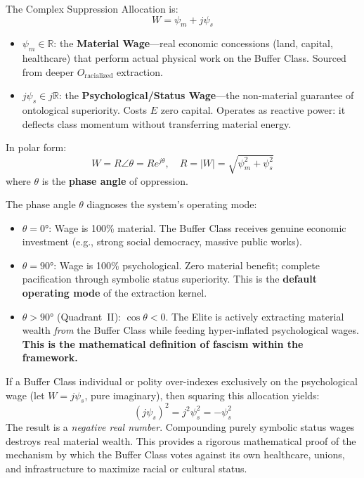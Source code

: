 \begin{definition}
\label{def:complex-wage}
The Complex Suppression Allocation is:
\begin{equation}\label{eq:2.2b-complex-wage-def}
W = \psi_m + j\psi_s
\end{equation}
\begin{itemize}
    \item $\psi_m \in \mathbb{R}$: the \textbf{Material Wage}---real economic
    concessions (land, capital, healthcare) that perform actual physical work on
    the Buffer Class. Sourced from deeper $O_{\text{racialized}}$ extraction.
    \item $j\psi_s \in j\mathbb{R}$: the \textbf{Psychological/Status
    Wage}---the non-material guarantee of ontological superiority. Costs $E$
    zero capital. Operates as reactive power: it deflects class momentum without
    transferring material energy.
\end{itemize}
In polar form:
\begin{equation}\label{eq:2.2c-polar-form}
W = R \angle\theta = R e^{j\theta}, \quad R = |W| = \sqrt{\psi_m^2 + \psi_s^2}
\end{equation}
where $\theta$ is the \textbf{phase angle} of oppression.
\end{definition}

The phase angle $\theta$ diagnoses the system's operating mode:
\begin{itemize}
    \item $\theta = 0°$: Wage is 100\% material. The Buffer Class receives genuine
    economic investment (e.g., strong social democracy, massive public works).
    \item $\theta = 90°$: Wage is 100\% psychological. Zero material benefit;
    complete pacification through symbolic status superiority. This is the
    \textbf{default operating mode} of the extraction kernel.
    \item $\theta > 90°$ (Quadrant~II): $\cos\theta < 0$. The Elite is actively
    extracting material wealth \emph{from} the Buffer Class while feeding
    hyper-inflated psychological wages. \textbf{This is the mathematical
    definition of fascism within the framework.}
\end{itemize}

\begin{theorem}
\label{thm:imaginary-squaring}
If a Buffer Class individual or polity over-indexes exclusively on the
psychological wage (let $W = j\psi_s$, pure imaginary), then squaring this
allocation yields:
\begin{equation}\label{eq:2.2d-imaginary-squaring}
(j\psi_s)^2 = j^2 \psi_s^2 = -\psi_s^2
\end{equation}
The result is a \emph{negative real number}. Compounding purely symbolic status
wages destroys real material wealth. This provides a rigorous mathematical proof
of the mechanism by which the Buffer Class votes against its own healthcare,
unions, and infrastructure to maximize racial or cultural status.
\end{theorem}

